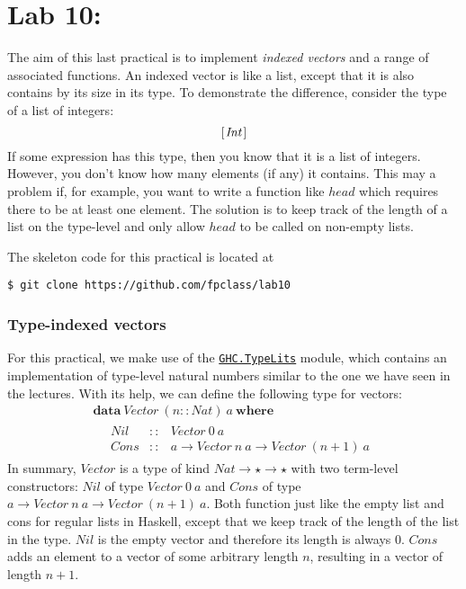 \section{Lab 10: \practicalNineTitle}

The aim of this last practical is to implement \emph{indexed vectors} and a range of associated functions. An indexed vector is like a list, except that it is also contains by its size in its type. To demonstrate the difference, consider the type of a list of integers:
\begin{displaymath}
[\mskip1.5mu \mathit{Int} \mskip1.5mu]
\end{displaymath}
If some expression has this type, then you know that it is a list of integers. However, you don't know how many elements (if any) it contains. This may a problem if, for example, you want to write a function like $\mathit{head}$ which requires there to be at least one element. The solution is to keep track of the length of a list on the type-level and only allow $\mathit{head}$ to be called on non-empty lists.

The skeleton code for this practical is located at 
\begin{verbatim}
$ git clone https://github.com/fpclass/lab10
\end{verbatim}

\subsubsection{Type-indexed vectors}

For this practical, we make use of the \href{https://hackage.haskell.org/package/base/docs/GHC-TypeLits.html}{\texttt{GHC.TypeLits}} module, which contains an implementation of type-level natural numbers similar to the one we have seen in the lectures. With its help, we can define the following type for vectors: 
\begin{displaymath}
\begin{array}{l}
\mathbf{data}~\mathit{Vector}~(n :: \mathit{Nat})~a~\mathbf{where} \\
\quad \begin{array}{lcl}
\mathit{Nil}  & :: & \mathit{Vector}~0~a \\
\mathit{Cons} & :: & a \to \mathit{Vector}~n~a \to \mathit{Vector}~(n+1)~a
\end{array}
\end{array}
\end{displaymath}
In summary, $\mathit{Vector}$ is a type of kind $\mathit{Nat} \to \star \to \star$ with two term-level constructors: $\mathit{Nil}$ of type $\mathit{Vector~0~a}$ and $\mathit{Cons}$ of type $a \to \mathit{Vector}~n~a \to \mathit{Vector}~(n+1)~a$. Both function just like the empty list and cons for regular lists in Haskell, except that we keep track of the length of the list in the type. $\mathit{Nil}$ is the empty vector and therefore its length is always $0$. $\mathit{Cons}$ adds an element to a vector of some arbitrary length $n$, resulting in a vector of length $n+1$.

